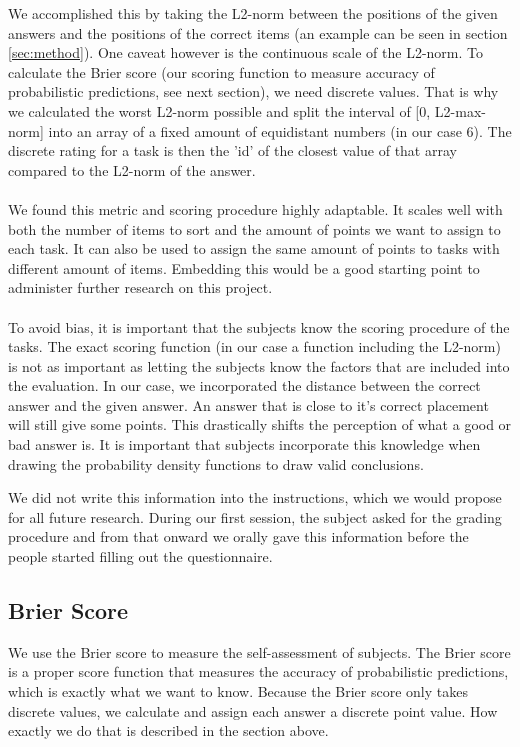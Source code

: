 \documentclass[../main/main.tex]{subfiles}
\begin{document}
	We accomplished this by taking the L2-norm between the positions of the given answers and the positions of the correct items (an example can be seen in section \ref{sec:method}).	One caveat however is the continuous scale of the L2-norm. To calculate the Brier score (our scoring function to measure accuracy of probabilistic predictions, see next section), we need discrete values. That is why we calculated the worst L2-norm possible and split the interval of [0, L2-max-norm] into an array of a fixed amount of equidistant numbers (in our case 6). The discrete rating for a task is then the 'id' of the closest value of that array compared to the L2-norm of the answer.
	\\\\
	We found this metric and scoring procedure highly adaptable. It scales well with both the number of items to sort and the amount of points we want to assign to each task. It can also be used to assign the same amount of points to tasks with different amount of items. Embedding this would be a good starting point to administer further research on this project.
	\\\\
	To avoid bias, it is important that the subjects know the scoring procedure of the tasks. The exact scoring function (in our case a function including the L2-norm) is not as important as letting the subjects know the factors that are included into the evaluation. In our case, we incorporated the distance between the correct answer and the given answer. An answer that is close to it's correct placement will still give some points. This drastically shifts the perception of what a good or bad answer is. It is important that subjects incorporate this knowledge when drawing the probability density functions to draw valid conclusions.
	
	We did not write this information into the instructions, which we would propose for all future research. During our first session, the subject asked for the grading procedure and from that onward we orally gave this information before the people started filling out the questionnaire.
	
	\subsection{Brier Score}
	\label{sec:brier_score}
	
	We use the Brier score to measure the self-assessment of subjects. The Brier score is a proper score function that measures the accuracy of probabilistic predictions, which is exactly what we want to know. Because the Brier score only takes discrete values, we calculate and assign each answer a discrete point value. How exactly we do that is described in the section above.
	
\end{document}
